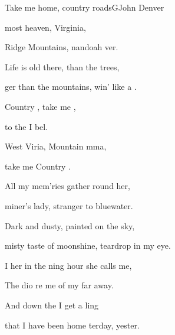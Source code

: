 \setcounter{page}{126}
\begin{song}{Take me home, country roads}{G}{John Denver}

\begin{SBVerse}


most heaven,  Virginia,

 Ridge Mountains, nandoah ver.

Life is old there,  than the trees,

ger than the mountains, win' like a .

\end{SBVerse}

\begin{SBChorus}

Country , take me ,

to the  I bel.

West Viria, Mountain mma,

take me  Country .

\end{SBChorus}

\begin{SBVerse}

All my mem'ries gather round her,

miner's lady, stranger to bluewater.

Dark and dusty, painted on the sky,

misty taste of moonshine, teardrop in my eye.

\end{SBVerse}

\begin{SBChorus}

\end{SBChorus}

\begin{SBChorus*}

I  her  in the ning hour she calls me,

The dio re me of my  far away.

And  down the  I get a ling

that I  have been home terday, yester.

\end{SBChorus*}

\begin{SBChorus}

\end{SBChorus}

\end{song}

\clearpage
